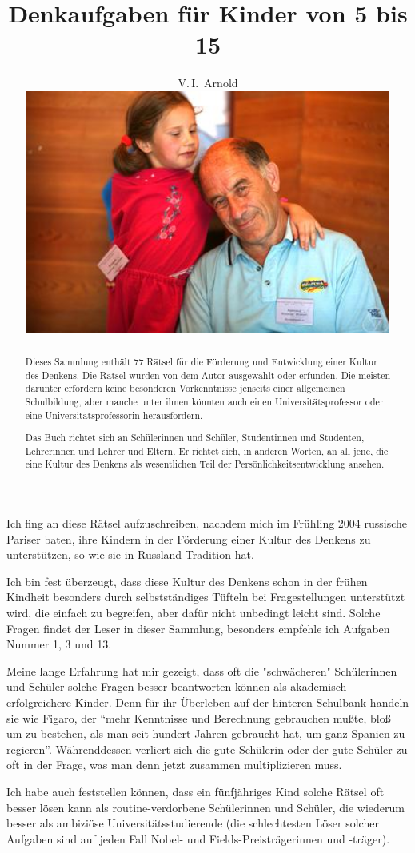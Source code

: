 \documentclass[12pt]{article} %
\title{ Denkaufgaben für Kinder von 5 bis 15}
\author{V.\,I.~Arnold
\vspace*{2cm}\\ 
\includegraphics[width=12cm]{photo-arnold_small}
}
\date{}
\begin{document}
\def\eps{\varepsilon}
\maketitle
\thispagestyle{empty}

\newpage 
\setcounter{page}{1}
\begin{abstract}

Dieses Sammlung enthält 77 Rätsel für die Förderung und Entwicklung einer Kultur des Denkens. Die Rätsel wurden von dem Autor ausgewählt oder erfunden. Die meisten darunter erfordern keine besonderen Vorkenntnisse jenseits einer allgemeinen Schulbildung, aber manche unter ihnen könnten auch einen Universitätsprofessor oder eine Universitätsprofessorin herausfordern. 

Das Buch richtet sich an Schülerinnen und Schüler, Studentinnen und Studenten, Lehrerinnen und Lehrer und Eltern. Er richtet sich, in anderen Worten, an all jene, die eine Kultur des Denkens als wesentlichen Teil der Persönlichkeitsentwicklung ansehen.

\end{abstract}

\newpage

Ich fing an diese Rätsel aufzuschreiben, nachdem mich im Frühling 2004 russische Pariser baten, ihre Kindern in der Förderung einer Kultur des Denkens zu unterstützen, so wie sie in Russland Tradition hat.

Ich bin fest überzeugt, dass diese Kultur des Denkens schon in der frühen Kindheit besonders durch selbstständiges Tüfteln bei Fragestellungen unterstützt wird, die einfach zu begreifen, aber dafür nicht unbedingt leicht sind. Solche Fragen findet der Leser in dieser Sammlung, besonders empfehle ich Aufgaben Nummer 1, 3 und 13.

Meine lange Erfahrung hat mir gezeigt, dass oft die "schwächeren" Schülerinnen und Schüler solche Fragen besser beantworten können als akademisch erfolgreichere Kinder. Denn für ihr Überleben auf der hinteren Schulbank handeln sie wie Figaro, der “mehr Kenntnisse und Berechnung gebrauchen mußte, bloß um zu bestehen, als man seit hundert Jahren gebraucht hat, um ganz Spanien zu regieren”. Währenddessen verliert sich die gute Schülerin oder der gute Schüler zu oft in der Frage, was man denn jetzt zusammen multiplizieren muss. 

Ich habe auch feststellen können, dass ein fünfjähriges Kind solche Rätsel oft besser lösen kann als routine-verdorbene Schülerinnen und Schüler, die wiederum besser als ambiziöse Universitätsstudierende (die schlechtesten Löser solcher Aufgaben sind auf jeden Fall Nobel- und Fields-Preisträgerinnen und -träger).
\end{document}
